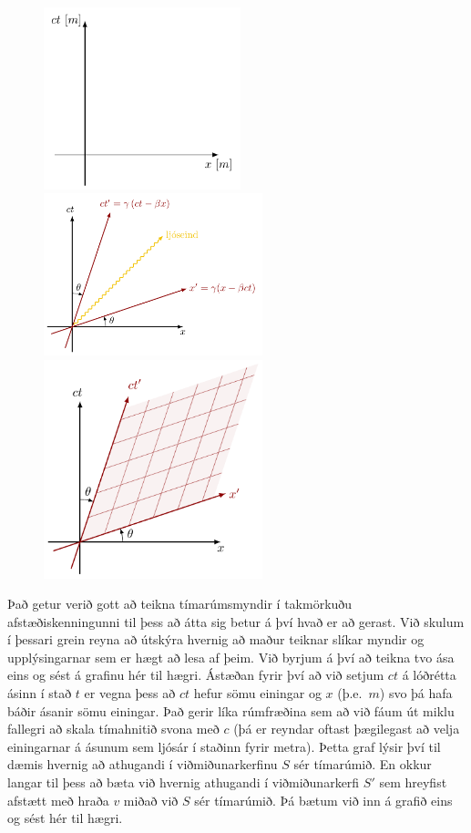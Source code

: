 \begin{minipage}{\linewidth}

\begin{figure}
\vspace{-2cm}
\includegraphics[width = 2.25in]{figures/spacetime1.pdf}
\includegraphics[width = 2.5in]{figures/spacetime2.pdf}
\includegraphics[width = 2.5in]{figures/spacetime3.pdf}
\end{figure}
Það getur verið gott að teikna tímarúmsmyndir í takmörkuðu afstæðiskenningunni til þess að átta sig betur á því hvað er að gerast. Við skulum í þessari grein reyna að útskýra hvernig að maður teiknar slíkar myndir og upplýsingarnar sem er hægt að lesa af þeim. Við byrjum á því að teikna tvo ása eins og sést á grafinu hér til hægri. Ástæðan fyrir því að við setjum $ct$ á lóðrétta ásinn í stað $t$ er vegna þess að $ct$ hefur sömu einingar og $x$ (þ.e.~$\si{m}$) svo þá hafa báðir ásanir sömu einingar. Það gerir líka rúmfræðina sem að við fáum út miklu fallegri að skala tímahnitið svona með $c$ (þá er reyndar oftast þægilegast að velja einingarnar á ásunum sem ljósár í staðinn fyrir metra). Þetta graf lýsir því til dæmis hvernig að athugandi í viðmiðunarkerfinu $S$ sér tímarúmið. En okkur langar til þess að bæta við hvernig athugandi í viðmiðunarkerfi $S'$ sem hreyfist afstætt með hraða $v$ miðað við $S$ sér tímarúmið. Þá bætum við inn á grafið eins og sést hér til hægri.


\end{minipage}
